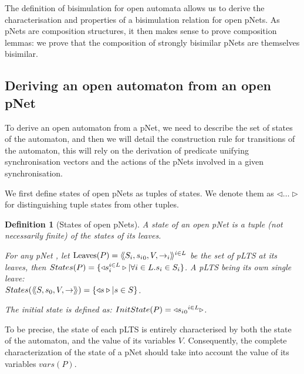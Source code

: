\documentclass{lmcs}
\newcommand{\LUDO}[1]{\textcolor{darkgreen}{#1}}
\newtheorem{definition}{Definition}
\begin{document}
The definition of bisimulation for open automata allows us to derive the characterisation and properties of a
bisimulation relation for open pNets. As pNets are composition
structures, it then makes sense to prove composition lemmas: we prove
that the composition of strongly bisimilar pNets are themselves
bisimilar. 

\subsection{Deriving an open automaton from an open pNet}
To derive an open automaton from a pNet, we need to describe the set of states of the automaton, and then we will detail the construction rule for transitions of the automaton, this will rely on the derivation of predicate unifying synchronisation vectors and the actions of the pNets involved in a given synchronisation.


We first define states of open pNets as tuples of states. We denote them
 as $\triangleleft\ldots\triangleright$ for distinguishing tuple 
states from other tuples.
\begin{definition}[States of open pNets]\label{def-states}
  A state of an open pNet is a tuple (not necessarily finite) of the
  states of its leaves.

  For any pNet \pNet, let $\operatorname{Leaves}(P) = \langle\hspace{-0.45ex}\langle S_i,{s_i}_0,V, \to_i\rangle\hspace{-0.45ex}\rangle^{i \in L}$ be 
  the set of pLTS at its leaves,
  then $States(P) = \{\triangleleft s_i^{i\in L}
  \triangleright| \forall i\in L. s_i \in S_i\}$.
A pLTS being its own single leave:\\
  $States(\langle\hspace{-0.45ex}\langle S,s_0,V, \to\rangle\hspace{-0.45ex}\rangle) = \{\triangleleft s \triangleright| s \in S \}$.  

The initial state is defined as:
$InitState(P) = \triangleleft {{s_i}_0}^{i\in L}  \triangleright$.
\end{definition}
To be precise, the state of each pLTS is entirely characterised by both the state of the automaton, and the value of its variables $V$. Consequently, the complete characterization of the state of a pNet should take into account the value of its variables $vars(P)$.
\end{document}
